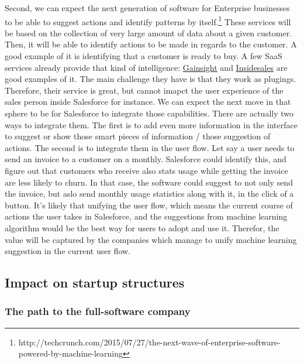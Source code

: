 \documentclass[12pt]{article}
\begin{document}
Second, we can expect the next generation of software for Enterprise businesses to be able to suggest actions and identify patterns by itself.\footnote{http://techcrunch.com/2015/07/27/the-next-wave-of-enterprise-software-powered-by-machine-learning} These services will be based on the collection of very large amount of data about a given customer. Then, it will be able to identify actions to be made in regards to the customer. A good example of it is identifying that a customer is ready to buy. A few SaaS services already provide that kind of intelligence: \href{http://www.gainsight.com/}{Gainsight} and \href{http://uk.insidesales.com/}{Insidesales} are good examples of it. 
The main challenge they have is that they work as plugings. Therefore, their service is great, but cannot imapct the user experience of the sales person inside Salesforce for instance. 
We can expect the next move in that sphere to be for Salesforce to integrate those capabilities. There are actually two ways to integrate them. The first is to add even more information in the interface to suggest or show those smart pieces of information / those suggestion of actions. The second is to integrate them in the user flow. Let say a user needs to send an invoice to a customer on a monthly. Salesforce could identify this, and figure out that customers who receive also stats usage while getting the invoice are less likely to churn. In that case, the software could suggest to not only send the invoice, but aslo send monthly usage statistics along with it, in the click of a button.
It's likely that unifying the user flow, which means the current course of actions the user takes in Salesforce, and the suggestions from machine learning algorithm would be the best way for users to adopt and use it. Therefor, the value will be captured by the companies which manage to unify machine learning suggestion in the current user flow. 

\subsection{Impact on startup structures}

\subsubsection{The path to the full-software company}
\end{document}
